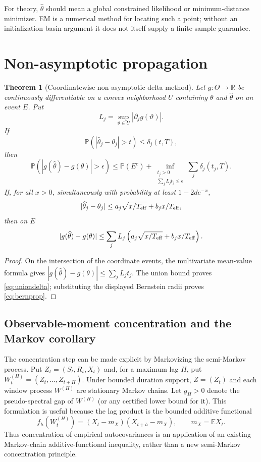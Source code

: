 \documentclass[11pt]{article}
\newtheorem{theorem}{Theorem}
\theoremstyle{definition}
\theoremstyle{remark}
\newcommand{\E}{\mathbb E}
\newcommand{\Pp}{\mathbb P}
\newcommand{\R}{\mathbb R}
\begin{document}
For theory, $\widehat\theta$ should mean a global constrained likelihood or
minimum-distance minimizer.  EM is a numerical method for locating such a
point; without an initialization-basin argument it does not itself supply a
finite-sample guarantee.

\section{Non-asymptotic propagation}
\label{sec:nonasymptotic-propagation}

\begin{theorem}[Coordinatewise non-asymptotic delta method]
\label{thm:propagation}
Let $g:\Theta\to\R$ be continuously differentiable on a convex neighborhood
$U$ containing $\theta$ and $\widehat\theta$ on an event $E$.  Put
\[
 L_j=\sup_{\vartheta\in U}|\partial_jg(\vartheta)|.
\]
If
\[
 \Pp(|\widehat\theta_j-\theta_j|>t)
 \le\delta_j(t,T),
\]
then
\begin{equation}
 \Pp(|g(\widehat\theta)-g(\theta)|>\epsilon)
 \le \Pp(E^c)+
 \inf_{\substack{t_j>0\\\sum_jL_jt_j\le\epsilon}}
 \sum_j\delta_j(t_j,T).
 \label{eq:uniondelta}
\end{equation}
If, for all $x>0$, simultaneously with probability at least $1-2de^{-x}$,
\[
 |\widehat\theta_j-\theta_j|
 \le a_j\sqrt{x/T_{\rm eff}}+b_jx/T_{\rm eff},
\]
then on $E$
\begin{equation}
 |g(\widehat\theta)-g(\theta)|
 \le\sum_jL_j
 \left(a_j\sqrt{x/T_{\rm eff}}+b_jx/T_{\rm eff}\right).
 \label{eq:bernprop}
\end{equation}
\end{theorem}

\begin{proof}
On the intersection of the coordinate events, the multivariate mean-value
formula gives
$|g(\widehat\theta)-g(\theta)|\le\sum_jL_jt_j$.
The union bound proves \eqref{eq:uniondelta}; substituting the displayed
Bernstein radii proves \eqref{eq:bernprop}.
\end{proof}

\subsection{Observable-moment concentration and the Markov corollary}

The concentration step can be made explicit by Markovizing the semi-Markov
process.  Put $Z_t=(S_t,R_t,X_t)$ and, for a maximum lag $H$, put
$W_t^{(H)}=(Z_t,\ldots,Z_{t+H})$.  Under bounded duration support,
$Z=(Z_t)$ and each window process $W^{(H)}$ are stationary Markov chains.
Let $g_H>0$ denote the pseudo-spectral gap of $W^{(H)}$ (or any certified lower
bound for it).  This formulation is useful because the lag product is the
bounded additive functional
\[
 f_h(W_t^{(H)})=(X_t-m_X)(X_{t+h}-m_X),
 \qquad m_X=\E X_t.
\]
Thus concentration of empirical autocovariances is an application of an
existing Markov-chain additive-functional inequality, rather than a new
semi-Markov concentration principle.
\end{document}
